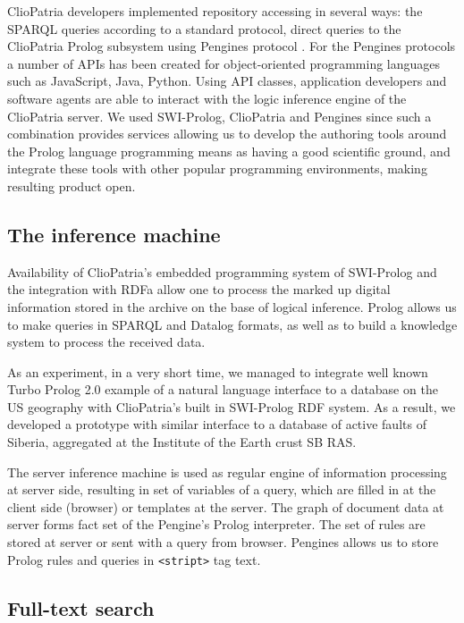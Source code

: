 \documentclass[conference,a4paper]{IEEEtran}
\begin{document}
ClioPatria developers implemented repository accessing in several ways: the SPARQL queries according to a standard protocol, direct queries to the ClioPatria Prolog subsystem using Pengines protocol \cite{b9}.  For the Pengines protocols a number of APIs has been created for object-oriented programming languages such as JavaScript, Java, Python.  Using API classes, application developers and software agents are able to interact with the logic inference engine of the ClioPatria server.  We used SWI-Prolog, ClioPatria and Pengines since such a combination provides services allowing us to develop the authoring tools around the Prolog language programming means as having a good scientific ground, and integrate these tools with other popular programming environments, making resulting product open.

\subsection{The inference machine}

Availability of ClioPatria's embedded programming system of SWI-Prolog \cite{b10} and the integration with RDFa allow one to process the marked up digital information stored in the archive on the base of logical inference.  Prolog allows us to make queries in SPARQL and Datalog formats, as well as to build a knowledge system to process the received data.

As an experiment, in a very short time, we managed to integrate well known Turbo Prolog 2.0 example of a natural language interface to a database on the US geography with ClioPatria's built in SWI-Prolog RDF system.  As a result, we developed a prototype with similar interface to a database of active faults of Siberia, aggregated at the Institute of the Earth crust SB RAS.

The server inference machine is used as regular engine of information processing at server side, resulting in set of variables of a query, which are filled in at the client side (browser) or templates at the server.  The graph of document data at server forms fact set of the Pengine's Prolog interpreter.  The set of rules are stored at server or sent with a query from browser.  Pengines allows us to store Prolog rules and queries in \texttt{<stript>} tag text.

\subsection{Full-text search}
\end{document}
